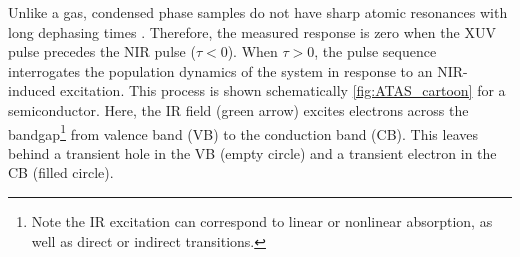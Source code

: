 

Unlike a gas, condensed phase samples do not have sharp atomic resonances with long dephasing times \cite{ramaseshaRealTimeProbingElectron2016}. Therefore, the measured response is zero when the XUV pulse precedes the NIR pulse ($\tau<0$). When $\tau>0$, the pulse sequence interrogates the population dynamics of the system in response to an NIR-induced excitation. This process is shown schematically \cref{fig:ATAS_cartoon} for a semiconductor. Here, the IR field (green arrow) excites electrons across the bandgap\footnote{Note the IR excitation can correspond to linear or nonlinear absorption, as well as direct or indirect transitions.} from valence band (VB) to the conduction band (CB). This leaves behind a transient hole in the VB (empty circle) and a transient electron in the CB (filled circle). 

